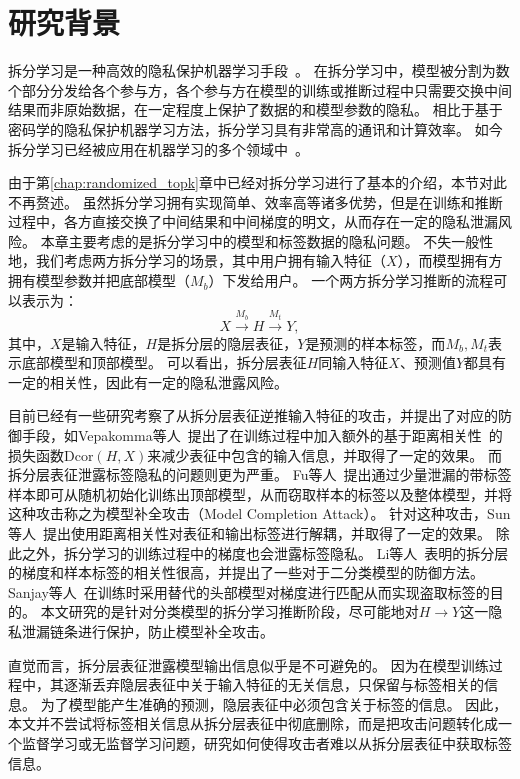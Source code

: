 \section{研究背景}
拆分学习是一种高效的隐私保护机器学习手段~\cite{vepakomma2018split,poirot2019split}。
在拆分学习中，模型被分割为数个部分分发给各个参与方，各个参与方在模型的训练或推断过程中只需要交换中间结果而非原始数据，在一定程度上保护了数据的和模型参数的隐私。
%
相比于基于密码学的隐私保护机器学习方法，拆分学习具有非常高的通讯和计算效率。
%
如今拆分学习已经被应用在机器学习的多个领域中~\cite{palanisamy2021spliteasy,fagbohungbe2022split_edge_image,ccc2022vfgnn}。

由于第\ref{chap:randomized_topk}章中已经对拆分学习进行了基本的介绍，本节对此不再赘述。
%
虽然拆分学习拥有实现简单、效率高等诸多优势，但是在训练和推断过程中，各方直接交换了中间结果和中间梯度的明文，从而存在一定的隐私泄漏风险。
%
本章主要考虑的是拆分学习中的模型和标签数据的隐私问题。
%
不失一般性地，我们考虑两方拆分学习的场景，其中用户拥有输入特征（$X$），而模型拥有方拥有模型参数并把底部模型（$M_b$）下发给用户。
一个两方拆分学习推断的流程可以表示为：
\begin{equation}
    X \stackrel{M_b}{\to} H \stackrel{M_t}{\to} Y,
\end{equation}
其中，$X$是输入特征，$H$是拆分层的隐层表征，$Y$是预测的样本标签，而$M_b, M_t$表示底部模型和顶部模型。
%
可以看出，拆分层表征$H$同输入特征$X$、预测值$Y$都具有一定的相关性，因此有一定的隐私泄露风险。


目前已经有一些研究考察了从拆分层表征逆推输入特征的攻击，并提出了对应的防御手段，如Vepakomma等人~\cite{vepakomma2020nopeek}提出了在训练过程中加入额外的基于距离相关性~\cite{szekely2007dcor}的损失函数$\text{Dcor}(H, X)$来减少表征中包含的输入信息，并取得了一定的效果。
%
而拆分层表征泄露标签隐私的问题则更为严重。
%
Fu等人~\cite{fucong2022label_infer_attack}提出通过少量泄漏的带标签样本即可从随机初始化训练出顶部模型，从而窃取样本的标签以及整体模型，并将这种攻击称之为模型补全攻击（Model Completion Attack）。
%
针对这种攻击，Sun等人~\cite{sunjiankai2022forward_embedding_protect}提出使用距离相关性对表征和输出标签进行解耦，并取得了一定的效果。
%
除此之外，拆分学习的训练过程中的梯度也会泄露标签隐私。
Li等人~\cite{oscarli2022label_defense_marvell}表明的拆分层的梯度和样本标签的相关性很高，并提出了一些对于二分类模型的防御方法。
Sanjay等人~\cite{sanjay2023exploit_split_learning}在训练时采用替代的头部模型对梯度进行匹配从而实现盗取标签的目的。
%
本文研究的是针对分类模型的拆分学习推断阶段，尽可能地对$H\to Y$这一隐私泄漏链条进行保护，防止模型补全攻击。

直觉而言，拆分层表征泄露模型输出信息似乎是不可避免的。
%
因为在模型训练过程中，其逐渐丢弃隐层表征中关于输入特征的无关信息，只保留与标签相关的信息。
为了模型能产生准确的预测，隐层表征中必须包含关于标签的信息。
%
因此，本文并不尝试将标签相关信息从拆分层表征中彻底删除，而是把攻击问题转化成一个监督学习或无监督学习问题，研究如何使得攻击者难以从拆分层表征中获取标签信息。
%

